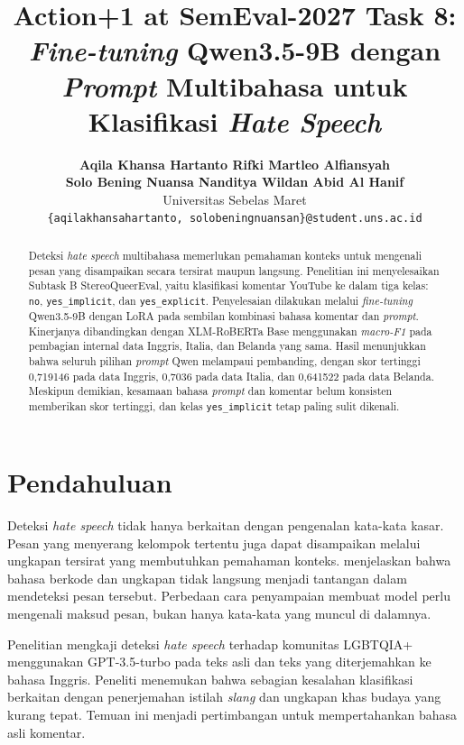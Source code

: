 \documentclass[11pt]{article}
\title{Action+1 at SemEval-2027 Task 8: \textit{Fine-tuning} Qwen3.5-9B dengan \textit{Prompt} Multibahasa untuk Klasifikasi \textit{Hate Speech}}
\author{\textbf{Aqila Khansa Hartanto \quad Rifki Martleo Alfiansyah} \\
\textbf{Solo Bening Nuansa Nanditya \quad Wildan Abid Al Hanif} \\
Universitas Sebelas Maret \\
\texttt{\{aqilakhansahartanto, solobeningnuansan\}@student.uns.ac.id}}
\renewcommand{\abstractname}{Abstrak}
\begin{document}
\renewcommand{\abstractname}{Abstrak}
\pagestyle{plain}
\raggedbottom
\maketitle
\begin{abstract}
Deteksi \textit{hate speech} multibahasa memerlukan pemahaman konteks untuk mengenali pesan yang disampaikan secara tersirat maupun langsung. Penelitian ini menyelesaikan Subtask B StereoQueerEval, yaitu klasifikasi komentar YouTube ke dalam tiga kelas: \texttt{no}, \texttt{yes\_implicit}, dan \texttt{yes\_explicit}. Penyelesaian dilakukan melalui \textit{fine-tuning} Qwen3.5-9B dengan LoRA pada sembilan kombinasi bahasa komentar dan \textit{prompt}. Kinerjanya dibandingkan dengan XLM-RoBERTa Base menggunakan \textit{macro-F1} pada pembagian internal data Inggris, Italia, dan Belanda yang sama. Hasil menunjukkan bahwa seluruh pilihan \textit{prompt} Qwen melampaui pembanding, dengan skor tertinggi 0,719146 pada data Inggris, 0,7036 pada data Italia, dan 0,641522 pada data Belanda. Meskipun demikian, kesamaan bahasa \textit{prompt} dan komentar belum konsisten memberikan skor tertinggi, dan kelas \texttt{yes\_implicit} tetap paling sulit dikenali.
\end{abstract}

\section{Pendahuluan}
\label{sec:pendahuluan}

Deteksi \textit{hate speech} tidak hanya berkaitan dengan pengenalan kata-kata kasar. Pesan yang menyerang kelompok tertentu juga dapat disampaikan melalui ungkapan tersirat yang membutuhkan pemahaman konteks. \citet{elsherief-etal-2021-latent} menjelaskan bahwa bahasa berkode dan ungkapan tidak langsung menjadi tantangan dalam mendeteksi pesan tersebut. Perbedaan cara penyampaian membuat model perlu mengenali maksud pesan, bukan hanya kata-kata yang muncul di dalamnya.

Penelitian \citet{chan-etal-2024-hate} mengkaji deteksi \textit{hate speech} terhadap komunitas LGBTQIA+ menggunakan GPT-3.5-turbo pada teks asli dan teks yang diterjemahkan ke bahasa Inggris. Peneliti menemukan bahwa sebagian kesalahan klasifikasi berkaitan dengan penerjemahan istilah \textit{slang} dan ungkapan khas budaya yang kurang tepat. Temuan ini menjadi pertimbangan untuk mempertahankan bahasa asli komentar.
\end{document}
